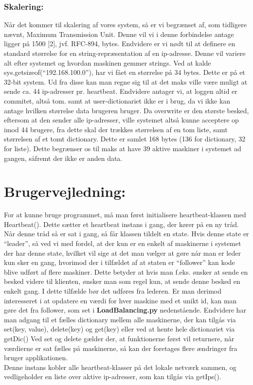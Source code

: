 \documentclass[a4paper,12pt]{article}
\begin{document}
\subsubsection{Skalering:}
Når det kommer til skalering af vores system, så er vi begrænset af, som tidligere nævnt,  Maximum Transmission Unit. Denne vil vi i denne forbindelse antage ligger på 1500 [2], jvf. RFC-894, bytes. Endvidere er vi nødt til at definere en standard størrelse for en string-repræsentation af en ip-adresse. Denne vil variere alt efter systemet og hvordan maskinen gemmer strings. Ved at kalde sys.getsizeof(“192.168.100.0”), har vi fået en størrelse på 34 bytes. Dette er på et 32-bit system.
Ud fra disse kan man regne sig til at det maks ville være muligt at sende ca. 44 ip-adresser pr. heartbeat. 
Endvidere antager vi, at loggen altid er commitet, altså tom. samt at user-dictionariet ikke er i brug, da vi ikke kan antage hvilken størrelse data brugeren bruger.
Da overwrite er den største besked, eftersom at den sender alle ip-adresser, ville systemet altså kunne acceptere op imod 44 brugere, fra dette skal der trækkes størrelsen af en tom liste, samt størrelsen af et tomt dictionary. Dette er samlet 168 bytes (136 for dictionary, 32 for liste). 
Dette begrænser os til maks at have 39 aktive maskiner i systemet ad gangen, såfremt der ikke er anden data.

\section{Brugervejledning:}
For at kunne bruge programmet, må man først initialisere heartbeat-klassen med Heartbeat(). Dette sætter et heartbeat instans i gang, der kører på en ny tråd.
\\[5px]
Når denne tråd så er sat i gang, så får klassen tildelt en state. Hvis denne state er “leader”, så ved vi med fordel, at der kun er en enkelt af maskinerne i systemet der har denne state, hvilket vil sige at det man vælger at gøre når man er leder kun sker en gang, hvorimod der i tilfældet af at staten er “follower” kan kode blive udført af flere maskiner. Dette betyder at hvis man f.eks. ønsker at sende en besked videre til klienten, ønsker man som regel kun, at sende denne besked en enkelt gang. I dette tilfælde bør det udføres fra lederen. Er man derimod interesseret i at opdatere en værdi for hver maskine med et unikt id, kan man gøre det fra follower, som set i \textbf{LoadBalancing.py} nedenstående.
Endvidere har man adgang til et fælles dictionary mellem alle maskinerne, der kan tilgås via set(key, value), delete(key) og get(key) eller ved at hente hele dictionariet via getDic()
Ved set og delete gælder der, at funktionerne først vil returnere, når værdierne er sat fælles på maskinerne, så kan der foretages flere ændringer fra bruger applikationen.
\\

Denne instans kobler alle heartbeat-klasser på det lokale netværk sammen, og vedligeholder en liste over aktive ip-adresser, som kan tilgås via getIps().
\end{document}
